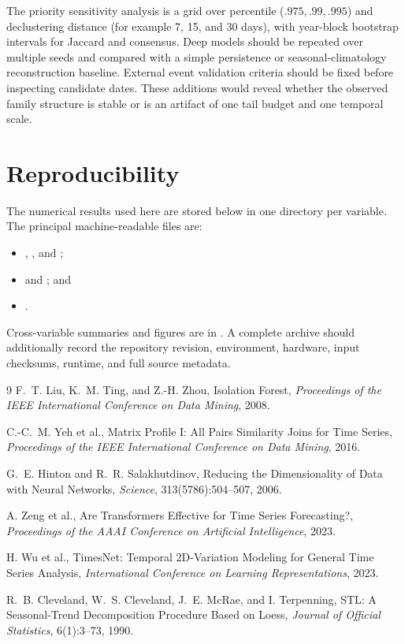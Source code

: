 \documentclass[11pt,a4paper]{article}
\begin{document}
The priority sensitivity analysis is a grid over percentile
($.975,.99,.995$) and declustering distance (for example 7, 15, and 30 days),
with year-block bootstrap intervals for Jaccard and consensus. Deep models
should be repeated over multiple seeds and compared with a simple persistence
or seasonal-climatology reconstruction baseline. External event validation
criteria should be fixed before inspecting candidate dates. These additions
would reveal whether the observed family structure is stable or is an artifact
of one tail budget and one temporal scale.

\section{Reproducibility}
The numerical results used here are stored below  in
one directory per variable. The principal machine-readable files are:
\begin{itemize}
\item {}, , and
;
\item {} and ; and
\item {}.
\end{itemize}
Cross-variable summaries and figures are in . A complete
archive should additionally record the repository revision, environment,
hardware, input checksums, runtime, and full source metadata.

\begin{thebibliography}{9}
F.~T. Liu, K.~M. Ting, and Z.-H. Zhou,
Isolation Forest,
\emph{Proceedings of the IEEE International Conference on Data Mining}, 2008.

C.-C.~M. Yeh et al.,
Matrix Profile I: All Pairs Similarity Joins for Time Series,
\emph{Proceedings of the IEEE International Conference on Data Mining}, 2016.

G.~E. Hinton and R.~R. Salakhutdinov,
Reducing the Dimensionality of Data with Neural Networks,
\emph{Science}, 313(5786):504--507, 2006.

A. Zeng et al.,
Are Transformers Effective for Time Series Forecasting?,
\emph{Proceedings of the AAAI Conference on Artificial Intelligence}, 2023.

H. Wu et al.,
TimesNet: Temporal 2D-Variation Modeling for General Time Series Analysis,
\emph{International Conference on Learning Representations}, 2023.

R.~B. Cleveland, W.~S. Cleveland, J.~E. McRae, and I. Terpenning,
STL: A Seasonal-Trend Decomposition Procedure Based on Loess,
\emph{Journal of Official Statistics}, 6(1):3--73, 1990.
\end{thebibliography}
\end{document}
